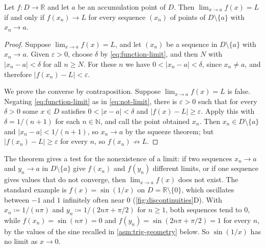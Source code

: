 \begin{theorem}
\label{thm:sequential-limit}
Let $f\colon D\to\mathbb R$ and let $a$ be an accumulation point of $D$. Then $\lim_{x\to a}f(x)=L$ if and only if $f(x_n)\to L$ for every sequence $(x_n)$ of points of $D\setminus\{a\}$ with $x_n\to a$.
\end{theorem}

\begin{proof}
Suppose $\lim_{x\to a}f(x)=L$, and let $(x_n)$ be a sequence in $D\setminus\{a\}$ with $x_n\to a$. Given $\varepsilon>0$, choose $\delta$ by \eqref{eq:function-limit}, and then $N$ with $|x_n-a|<\delta$ for all $n\ge N$. For these $n$ we have $0<|x_n-a|<\delta$, since $x_n\ne a$, and therefore $|f(x_n)-L|<\varepsilon$.

We prove the converse by contraposition. Suppose $\lim_{x\to a}f(x)=L$ is false. Negating \eqref{eq:function-limit} as in \eqref{eq:not-limit}, there is $\varepsilon>0$ such that for every $\delta>0$ some $x\in D$ satisfies $0<|x-a|<\delta$ and $|f(x)-L|\ge\varepsilon$. Apply this with $\delta=1/(n+1)$ for each $n\in\mathbb N$, and call the point obtained $x_n$. Then $x_n\in D\setminus\{a\}$ and $|x_n-a|<1/(n+1)$, so $x_n\to a$ by the squeeze theorem; but $|f(x_n)-L|\ge\varepsilon$ for every $n$, so $f(x_n)\not\to L$.
\end{proof}

The theorem gives a test for the nonexistence of a limit: if two sequences $x_n\to a$ and $y_n\to a$ in $D\setminus\{a\}$ give $f(x_n)$ and $f(y_n)$ different limits, or if one sequence gives values that do not converge, then $\lim_{x\to a}f(x)$ does not exist. The standard example is $f(x)=\sin(1/x)$ on $D=\mathbb R\setminus\{0\}$, which oscillates between $-1$ and $1$ infinitely often near $0$ (\cref{fig:discontinuities}D). With $x_n\coloneqq1/(n\pi)$ and $y_n\coloneqq1/(2n\pi+\pi/2)$ for $n\ge1$, both sequences tend to $0$, while $f(x_n)=\sin(n\pi)=0$ and $f(y_n)=\sin(2n\pi+\pi/2)=1$ for every $n$, by the values of the sine recalled in \cref{asm:trig-geometry} below. So $\sin(1/x)$ has no limit as $x\to0$.

